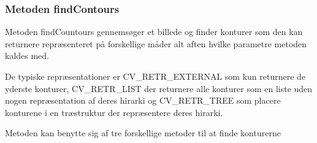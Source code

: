 \subsubsection{Metoden findContours}
Metoden findCountours gennemsøger et billede og finder konturer som den kan returnere 
repræsenteret på forskellige måder alt aften hvilke parametre metoden kaldes med.

De typiske repræsentationer er CV_RETR_EXTERNAL som kun returnere de yderste konturer,
CV_RETR_LIST der returnere alle konturer som en liste uden nogen repræsentation af deres hirarki og
CV_RETR_TREE som placere konturene i en træstruktur der repræsentere deres hirarki.

Metoden kan benytte sig af tre forskellige metoder til at finde konturerne



%
%
%
%
%
%
%
%


